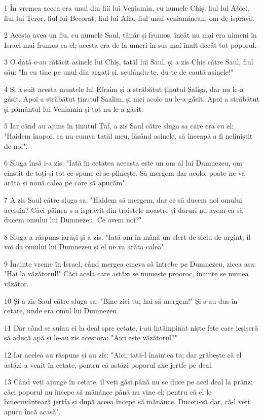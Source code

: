 \par 1 În vremea aceea era unul din fiii lui Veniamin, cu numele Chiș, fiul lui Abiel, fiul lui Țeror, fiul lui Becorat, fiul lui Afia, fiul unui veniaminean, om de ispravă.
\par 2 Acesta avea un fiu, cu numele Saul, tânăr și frumos, încât nu mai era nimeni în Israel mai frumos ca el; acesta era de la umeri în sus mai înalt decât tot poporul.
\par 3 O dată s-au rătăcit asinele lui Chiș, tatăl lui Saul, și a zis Chiș către Saul, fiul său: "Ia cu tine pe unul din argați și, sculându-te, du-te de caută asinele!"
\par 4 Și a suit acesta muntele lui Efraim și a străbătut ținutul Șalișa, dar nu le-a găsit. Apoi a străbătut ținutul Șaalim, și nici acolo nu le-a găsit. Apoi a străbătut și pământul lui Veniamin și tot nu le-a găsit.
\par 5 Iar când au ajuns în ținutul Țuf, a zis Saul către sluga sa care era cu el: "Haidem înapoi, ca nu cumva tatăl meu, lăsând asinele, să înceapă a fi neliniștit de noi".
\par 6 Sluga însă i-a zis: "Iată în cetatea aceasta este un om al lui Dumnezeu, om cinstit de toți și tot ce spune el se plinește. Să mergem dar acolo; poate ne va arăta și nouă calea pe care să apucăm".
\par 7 A zis Saul către sluga sa: "Haidem să mergem, dar ce să ducem noi omului aceluia? Căci pâinea s-a isprăvit din traistele noastre și daruri nu avem ca să ducem omului lui Dumnezeu. Ce avem noi?"
\par 8 Sluga a răspuns iarăși și a zis: "Iată am în mână un sfert de siclu de argint; îl voi da omului lui Dumnezeu și el ne va arăta calea".
\par 9 Înainte vreme în Israel, când mergea cineva să întrebe pe Dumnezeu, zicea așa: "Hai la văzătorul!" Căci acela care astăzi se numește prooroc, înainte se numea văzător.
\par 10 Și a zis Saul către sluga sa: "Bine zici tu; hai să mergem!" Și s-au dus în cetate, unde era omul lui Dumnezeu.
\par 11 Dar când se suiau ei la deal spre cetate, i-au întâmpinat niște fete care ieșiseră să aducă apă și le-au zis acestora: "Aici este văzătorul?"
\par 12 Iar acelea au răspuns și au zis: "Aici; iată-l înaintea ta; dar grăbește că el astăzi a venit în cetate, pentru că astăzi poporul axe jertfe pe deal.
\par 13 Când veți ajunge în cetate, îl veți găsi până nu se duce pe acel deal la prânz; căci poporul nu începe să mănânce până nu vine el; pentru că el le binecuvântează jertfa și după aceea începe să mănânce. Duceți-vă dar, că-l veți apuca încă acasă".
